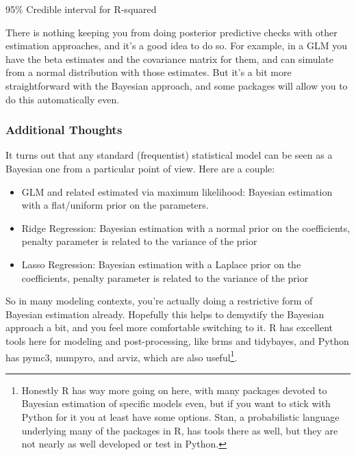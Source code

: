 \documentclass[
  letterpaper,
]{krantz}
\providecommand{\tightlist}{%
  \setlength{\itemsep}{0pt}\setlength{\parskip}{0pt}}\usepackage{longtable,booktabs,array}
\begin{document}
\begin{minipage}{\linewidth}
95\% Credible interval for R-squared\\
\end{minipage}

\begin{tcolorbox}[enhanced jigsaw, colframe=quarto-callout-tip-color-frame, opacityback=0, breakable, left=2mm, rightrule=.15mm, toprule=.15mm, arc=.35mm, leftrule=.75mm, colback=white, bottomrule=.15mm]

There is nothing keeping you from doing posterior predictive checks with
other estimation approaches, and it's a good idea to do so. For example,
in a GLM you have the beta estimates and the covariance matrix for them,
and can simulate from a normal distribution with those estimates. But
it's a bit more straightforward with the Bayesian approach, and some
packages will allow you to do this automatically even.

\end{tcolorbox}

\subsubsection{Additional Thoughts}\label{additional-thoughts}

It turns out that any standard (frequentist) statistical model can be
seen as a Bayesian one from a particular point of view. Here are a
couple:

\begin{itemize}
\tightlist
\item
  GLM and related estimated via maximum likelihood: Bayesian estimation
  with a flat/uniform prior on the parameters.
\item
  Ridge Regression: Bayesian estimation with a normal prior on the
  coefficients, penalty parameter is related to the variance of the
  prior
\item
  Lasso Regression: Bayesian estimation with a Laplace prior on the
  coefficients, penalty parameter is related to the variance of the
  prior
\end{itemize}

So in many modeling contexts, you're actually doing a restrictive form
of Bayesian estimation already. Hopefully this helps to demystify the
Bayesian approach a bit, and you feel more comfortable switching to it.
R has excellent tools here for modeling and post-processing, like brms
and tidybayes, and Python has pymc3, numpyro, and arviz, which are also
useful\footnote{Honestly R has way more going on here, with many
  packages devoted to Bayesian estimation of specific models even, but
  if you want to stick with Python for it you at least have some
  options. Stan, a probabilistic language underlying many of the
  packages in R, has tools there as well, but they are not nearly as
  well developed or test in Python.}.
\end{document}
